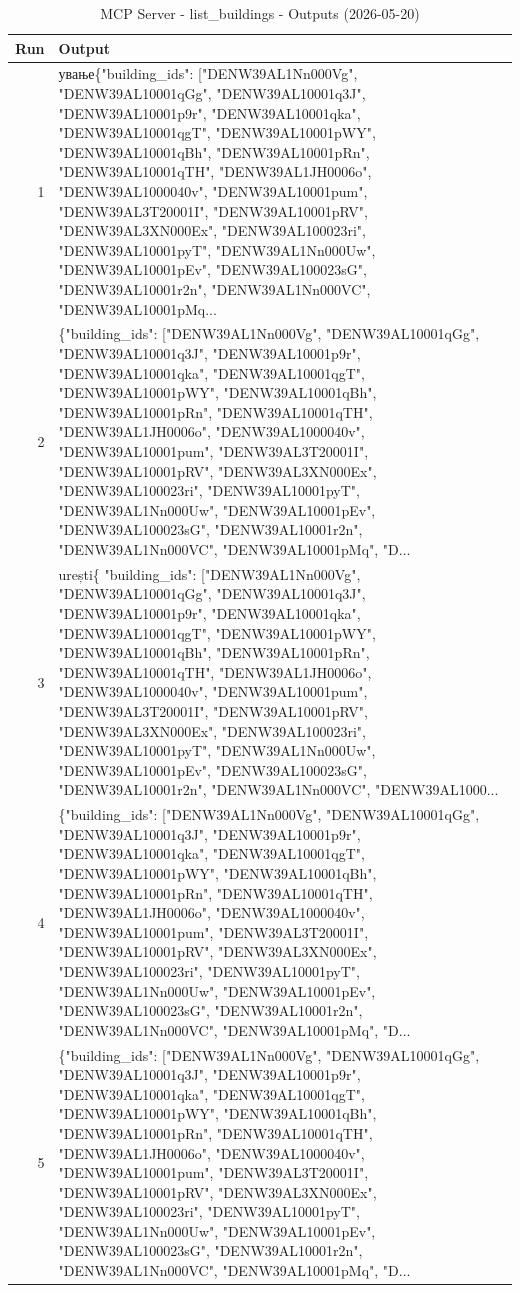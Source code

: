 \documentclass[a4paper,11pt]{article}
\begin{document}
\begin{table}[ht]
\centering
\scriptsize
\caption{MCP Server - list\_buildings - Outputs (2026-05-20)}
\label{tab:mcp\_list\_buildings\_outputs\_2026-05-20}
\begin{tabular}{r p{12cm}}
\hline
Run & Output \\
\hline
1 & ување\{"building\_ids": ["DENW39AL1Nn000Vg", "DENW39AL10001qGg", "DENW39AL10001q3J", "DENW39AL10001p9r", "DENW39AL10001qka", "DENW39AL10001qgT", "DENW39AL10001pWY", "DENW39AL10001qBh", "DENW39AL10001pRn", "DENW39AL10001qTH", "DENW39AL1JH0006o", "DENW39AL1000040v", "DENW39AL10001pum", "DENW39AL3T20001I", "DENW39AL10001pRV", "DENW39AL3XN000Ex", "DENW39AL100023ri", "DENW39AL10001pyT", "DENW39AL1Nn000Uw", "DENW39AL10001pEv", "DENW39AL100023sG", "DENW39AL10001r2n", "DENW39AL1Nn000VC", "DENW39AL10001pMq... \\
2 & \{"building\_ids": ["DENW39AL1Nn000Vg", "DENW39AL10001qGg", "DENW39AL10001q3J", "DENW39AL10001p9r", "DENW39AL10001qka", "DENW39AL10001qgT", "DENW39AL10001pWY", "DENW39AL10001qBh", "DENW39AL10001pRn", "DENW39AL10001qTH", "DENW39AL1JH0006o", "DENW39AL1000040v", "DENW39AL10001pum", "DENW39AL3T20001I", "DENW39AL10001pRV", "DENW39AL3XN000Ex", "DENW39AL100023ri", "DENW39AL10001pyT", "DENW39AL1Nn000Uw", "DENW39AL10001pEv", "DENW39AL100023sG", "DENW39AL10001r2n", "DENW39AL1Nn000VC", "DENW39AL10001pMq", "D... \\
3 & urești\{
  "building\_ids": ["DENW39AL1Nn000Vg", "DENW39AL10001qGg", "DENW39AL10001q3J", "DENW39AL10001p9r", "DENW39AL10001qka", "DENW39AL10001qgT", "DENW39AL10001pWY", "DENW39AL10001qBh", "DENW39AL10001pRn", "DENW39AL10001qTH", "DENW39AL1JH0006o", "DENW39AL1000040v", "DENW39AL10001pum", "DENW39AL3T20001I", "DENW39AL10001pRV", "DENW39AL3XN000Ex", "DENW39AL100023ri", "DENW39AL10001pyT", "DENW39AL1Nn000Uw", "DENW39AL10001pEv", "DENW39AL100023sG", "DENW39AL10001r2n", "DENW39AL1Nn000VC", "DENW39AL1000... \\
4 & \{"building\_ids": ["DENW39AL1Nn000Vg", "DENW39AL10001qGg", "DENW39AL10001q3J", "DENW39AL10001p9r", "DENW39AL10001qka", "DENW39AL10001qgT", "DENW39AL10001pWY", "DENW39AL10001qBh", "DENW39AL10001pRn", "DENW39AL10001qTH", "DENW39AL1JH0006o", "DENW39AL1000040v", "DENW39AL10001pum", "DENW39AL3T20001I", "DENW39AL10001pRV", "DENW39AL3XN000Ex", "DENW39AL100023ri", "DENW39AL10001pyT", "DENW39AL1Nn000Uw", "DENW39AL10001pEv", "DENW39AL100023sG", "DENW39AL10001r2n", "DENW39AL1Nn000VC", "DENW39AL10001pMq", "D... \\
5 & \{"building\_ids": ["DENW39AL1Nn000Vg", "DENW39AL10001qGg", "DENW39AL10001q3J", "DENW39AL10001p9r", "DENW39AL10001qka", "DENW39AL10001qgT", "DENW39AL10001pWY", "DENW39AL10001qBh", "DENW39AL10001pRn", "DENW39AL10001qTH", "DENW39AL1JH0006o", "DENW39AL1000040v", "DENW39AL10001pum", "DENW39AL3T20001I", "DENW39AL10001pRV", "DENW39AL3XN000Ex", "DENW39AL100023ri", "DENW39AL10001pyT", "DENW39AL1Nn000Uw", "DENW39AL10001pEv", "DENW39AL100023sG", "DENW39AL10001r2n", "DENW39AL1Nn000VC", "DENW39AL10001pMq", "D... \\

\end{tabular}
\end{table}
\end{document}
